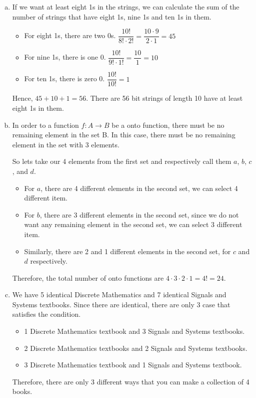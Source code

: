 \documentclass[12pt]{article}
\begin{document}
\begin{enumerate}[a)]
        \item If we want at least eight 1s in the strings, we can calculate the sum of the number of strings that have eight 1s, nine 1s and ten 1s in them.
            \begin{itemize}
                \item For eight 1s, there are two 0s. 
                        $\dfrac{10!}{8! \cdot 2!} = \dfrac{10 \cdot 9}{2 \cdot 1} = 45$
                \item For nine 1s, there is one 0.
                        $\dfrac{10!}{9! \cdot 1!} = \dfrac{10}{1} = 10$
                \item For ten 1s, there is zero 0.
                        $\dfrac{10!}{10!} = 1$
            \end{itemize}{}
            Hence, $45 + 10 + 1 = 56$. There are 56 bit strings of length 10 have at least eight 1s in them.
\pagebreak{}
        \item In order to a function $f: A \rightarrow B$ be a onto function, there must be no remaining element in the set B. In this case, there must be no remaining element in the set with 3 elements.
        
        So lets take our 4 elements from the first set and respectively call them $a$, $b$, $c$, and $d$.
        \begin{itemize}
            \item For $a$, there are 4 different elements in the second set, we can select 4 different item.
            \item For $b$, there are 3 different elements in the second set, since we do not want any remaining element in the second set, we can select 3 different item.
            \item Similarly, there are 2 and 1 different elements in the second set, for $c$ and $d$ respectively.
        \end{itemize}{}
        Therefore, the total number of onto functions are $4 \cdot 3 \cdot 2 \cdot 1 = 4! = 24$.
        
        \item We have 5 identical Discrete Mathematics and 7 identical Signals and Systems textbooks. Since there are identical, there are only 3 case that satisfies the condition.
        \begin{itemize}
            \item 1 Discrete Mathematics textbook and 3 Signals and Systems textbooks.
            \item 2 Discrete Mathematics textbooks and 2 Signals and Systems textbooks.
            \item 3 Discrete Mathematics textbook and 1 Signals and Systems textbook.
        \end{itemize}{}
        Therefore, there are only 3 different ways that you can make a collection of 4 books.
    \end{enumerate}{}
\end{document}

